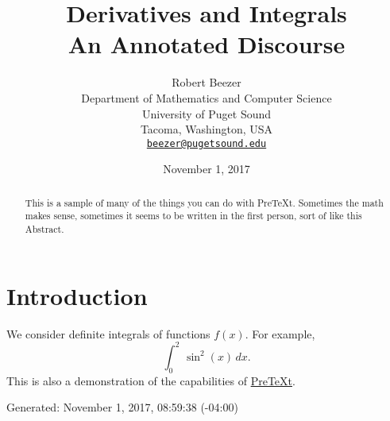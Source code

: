 \documentclass[10pt,]{article}
\title{Derivatives and Integrals\\
{\large An Annotated Discourse}}
\author{Robert Beezer\\
Department of Mathematics and Computer Science\\
University of Puget Sound\\
Tacoma, Washington, USA\\
\href{mailto:beezer@pugetsound.edu}{\nolinkurl{beezer@pugetsound.edu}}
}
\date{November 1, 2017}
\theoremstyle{plain}
\theoremstyle{definition}
\theoremstyle{definition}
\theoremstyle{definition}
\theoremstyle{definition}
\theoremstyle{definition}
\theoremstyle{definition}
\numberwithin{equation}{section}
\newcommand{\definiteintegral}[4]{\int_{#1}^{#2}\,#3\,d#4}
\begin{document}
\hypertarget{derivatives}{}
\maketitle
\thispagestyle{empty}
\begin{abstract}
\hypertarget{p-1}{}%
This is a sample of many of the things you can do with PreTeXt.  Sometimes the math makes sense, sometimes it seems to be written in the first person, sort of like this Abstract.%
\end{abstract}
\typeout{************************************************}
\typeout{************************************************}
\section[{Introduction}]{Introduction}\label{section-1}
\hypertarget{p-2}{}%
We consider definite integrals of functions \(f(x)\).  For example,%
\begin{equation*}
\definiteintegral{0}{2}{\sin^2(x)}{x}\text{.}
\end{equation*}
This is also a demonstration of the capabilities of \href{http://mathbook.pugetsound.edu}{PreTeXt}.\label{notation-1}
%
\par
\hypertarget{p-3}{}%
Generated: November 1, 2017, 08:59:38 (-04:00)%
\typeout{************************************************}
\typeout{************************************************}
\end{document}
